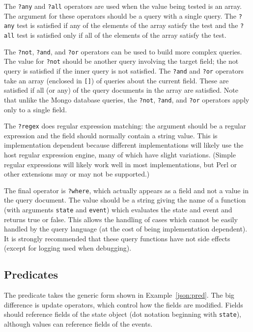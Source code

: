 \documentclass{article}
\begin{document}
  The \texttt{?any} and \texttt{?all} operators are used when the
  value being tested is an array.  The argument for these operators
  should be a query with a single query.  The \texttt{?any} test is
  satisfied if any of the elements of the array satisfy the test
  and the \texttt{?all} test is satisfied only if all of the
  elements of the array satisfy the test.

  The \texttt{?not}, \texttt{?and}, and \texttt{?or} operators can
  be used to build more complex queries.  The value for \texttt{?not}
  should be another query involving the target field; the not query is
  satisfied if the inner query is not satisfied.  The \texttt{?and}
  and \texttt{?or} operators take an array (enclosed in \texttt{[]})
  of queries about the current field.  These are satisfied if all (or
  any) of the query documents in the array are satisfied.  Note that
  unlike the Mongo database queries, the \texttt{?not}, \texttt{?and},
  and \texttt{?or} operators apply only to a single field.
  
  The \texttt{?regex} does regular expression matching: the argument
  should be a regular expression and the field should normally contain
  a string value.  This is implementation dependent because different
  implementations will likely use the host regular expression engine,
  many of which have slight variations.  (Simple regular expressions
  will likely work well in most implementations, but Perl or other
  extensions may or may not be supported.)

  The final operator is \texttt{?where}, which actually appears as a
  field and not a value in the query document.  The value should be a
  string giving the name of a function (with arguments \texttt{state}
  and \texttt{event}) which evaluates the state and event and returns
  true or false.  This allows the handling of cases which cannot be
  easily handled by the query language (at the cost of being
  implementation dependent).  It is strongly recommended that these
  query functions have not side effects (except for logging used when
  debugging).  

  \subsection{Predicates}
  \label{sub:pred}

  The predicate takes the generic form shown in
  Example~\ref{json:pred}. The big difference is update operators,
  which control how the fields are modified.  Fields should reference
  fields of the state object (dot notation beginning with
  \texttt{state}), although values can reference fields of the
  events. 
\end{document}
